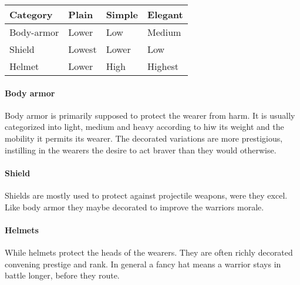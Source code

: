 \begin{longtable}{llll}
	\toprule
	Category   & Plain  & Simple & Elegant \\
	\midrule
	Body-armor & Lower  & Low    & Medium  \\
	Shield     & Lowest & Lower  & Low     \\
	Helmet     & Lower  & High   & Highest \\
	\bottomrule
\end{longtable}

\paragraph{Body armor}

Body armor is primarily supposed to protect the wearer from harm. It is usually
categorized into light, medium and heavy according to hiw its weight and the
mobility it permits its wearer. The decorated variations are more prestigious,
instilling in the wearers the desire to act braver than they would otherwise.

\paragraph{Shield}

Shields are mostly used to protect against projectile weapons, were they excel.
Like body armor they maybe decorated to improve the warriors morale.

\paragraph{Helmets}

While helmets protect the heads of the wearers. They are often richly decorated
convening prestige and rank. In general a fancy hat means a warrior stays in
battle longer, before they route.

\printglossary[type=good, title=Glossary]{}\label{ch:Goods:Glossary}


